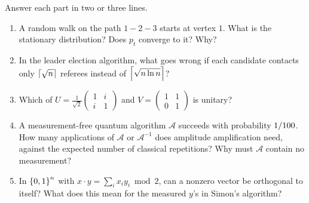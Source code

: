 \begin{question}
    Answer each part in two or three lines.
    \begin{enumerate}[label=(\alph*)]
        \item A random walk on the path $1 - 2 - 3$ starts at vertex $1$. What is the stationary
              distribution? Does $p_t$ converge to it? Why?
        \item In the leader election algorithm, what goes wrong if each candidate contacts only
              $\left\lceil\sqrt{n}\right\rceil$ referees instead of $\left\lceil\sqrt{n \ln n}\right\rceil$?
        \item Which of $U = \frac{1}{\sqrt{2}}\begin{pmatrix} 1 & i \\ i & 1 \end{pmatrix}$ and
              $V = \begin{pmatrix} 1 & 1 \\ 0 & 1 \end{pmatrix}$ is unitary?
        \item A measurement-free quantum algorithm $\mathcal{A}$ succeeds with probability
              $1/100$. How many applications of $\mathcal{A}$ or $\mathcal{A}^{-1}$ does
              amplitude amplification need, against the expected number of classical repetitions?
              Why must $\mathcal{A}$ contain no measurement?
        \item In $\left\lbrace0,1\right\rbrace^n$ with $x \cdot y = \sum_i x_i y_i \bmod 2$, can a nonzero vector be
              orthogonal to itself? What does this mean for the measured $y$'s in Simon's
              algorithm?
    \end{enumerate}
\end{question}
